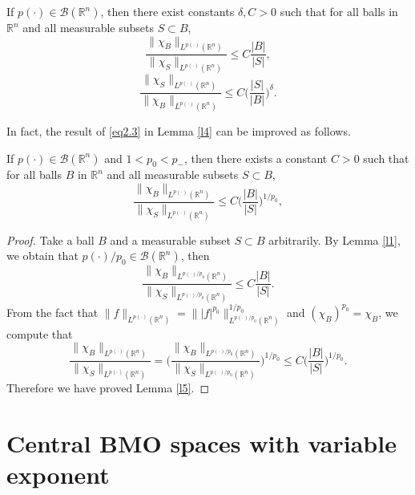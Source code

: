 \documentclass{amse-new}
\numberwithin{equation}{section} %
\begin{document}
\begin{lemma}\label{l4}
If $p(\cdot)\in \mathcal{B}(\mathbb{R}^n)$, then there exist constants $\delta, C>0$ such that for all balls in $\mathbb{R}^n$ and all measurable subsets $S\subset B$,
\begin{equation}\label{eq2.3}
\frac{\|\chi_{B}\|_{L^{p(\cdot)}(\mathbb{R}^n)}}{\|\chi_{S}\|_{L^{p(\cdot)}(\mathbb{R}^n)}}\leq C\frac{|B|}{|S|},
\end{equation}
\begin{equation}\label{eq2.4}
\frac{\|\chi_{S}\|_{L^{p(\cdot)}(\mathbb{R}^n)}}{\|\chi_{B}\|_{L^{p(\cdot)}(\mathbb{R}^n)}}\leq C\bigg(\frac{|S|}{|B|}\bigg)^{\delta}.
\end{equation}
\end{lemma}

In fact, the result of \eqref{eq2.3} in Lemma \ref{l4} can be improved as follows.
\begin{lemma}\label{l5}
If $p(\cdot)\in \mathcal{B}(\mathbb{R}^n)$ and $1<p_{0}<p_{-}$, then there exists a constant $C>0$ such that for all balls $B$ in $\mathbb{R}^n$ and all measurable subsets $S\subset B$,
\begin{equation}\label{eq2.5}
\frac{\|\chi_{B}\|_{L^{p(\cdot)}(\mathbb{R}^n)}}{\|\chi_{S}\|_{L^{p(\cdot)}(\mathbb{R}^n)}}\leq C\bigg(\frac{|B|}{|S|}\bigg)^{1/p_{0}},
\end{equation}
\end{lemma}
\begin{proof}
Take a ball $B$ and a measurable subset $S\subset B$ arbitrarily. By Lemma \ref{l1}, we obtain that $p(\cdot)/p_{0}\in \mathcal{B}(\mathbb{R}^n)$, then
$$\frac{\|\chi_{B}\|_{L^{p(\cdot)/p_{0}}(\mathbb{R}^n)}}{\|\chi_{S}\|_{L^{p(\cdot)/p_{0}}(\mathbb{R}^n)}}\leq C\frac{|B|}{|S|}.$$
From the fact that $\|f\|_{L^{p(\cdot)}(\mathbb{R}^n)}=\||f|^{p_{0}}\|^{1/p_{0}}_{L^{p(\cdot)/p_{0}}(\mathbb{R}^n)}$ and $(\chi_{B})^{p_{0}}=\chi_{B}$, we compute that
$$\frac{\|\chi_{B}\|_{L^{p(\cdot)}(\mathbb{R}^n)}}{\|\chi_{S}\|_{L^{p(\cdot)}(\mathbb{R}^n)}}
=\bigg(\frac{\|\chi_{B}\|_{L^{p(\cdot)/p_{0}}(\mathbb{R}^n)}}{\|\chi_{S}\|_{L^{p(\cdot)/p_{0}}(\mathbb{R}^n)}}\bigg)^{1/p_{0}}\leq C\bigg(\frac{|B|}{|S|}\bigg)^{1/p_{0}}.$$
Therefore we have proved Lemma \ref{l5}.
\end{proof}

\section{Central BMO spaces with variable exponent}
\end{document}
